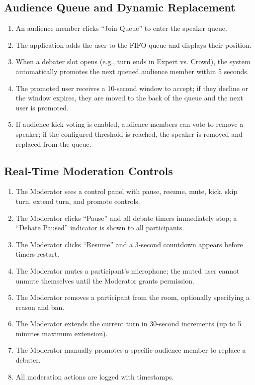 \documentclass[12pt]{article}
\begin{document}
\subsection{Audience Queue and Dynamic Replacement}

\begin{enumerate}
    \item An audience member clicks ``Join Queue'' to enter the speaker queue.
    \item The application adds the user to the FIFO queue and displays their position.
    \item When a debater slot opens (e.g., turn ends in Expert vs. Crowd), the system automatically promotes the next queued audience member within 5 seconds.
    \item The promoted user receives a 10-second window to accept; if they decline or the window expires, they are moved to the back of the queue and the next user is promoted.
    \item If audience kick voting is enabled, audience members can vote to remove a speaker; if the configured threshold is reached, the speaker is removed and replaced from the queue.
\end{enumerate}

\subsection{Real-Time Moderation Controls}

\begin{enumerate}
    \item The Moderator sees a control panel with pause, resume, mute, kick, skip turn, extend turn, and promote controls.
    \item The Moderator clicks ``Pause'' and all debate timers immediately stop; a ``Debate Paused'' indicator is shown to all participants.
    \item The Moderator clicks ``Resume'' and a 3-second countdown appears before timers restart.
    \item The Moderator mutes a participant's microphone; the muted user cannot unmute themselves until the Moderator grants permission.
    \item The Moderator removes a participant from the room, optionally specifying a reason and ban.
    \item The Moderator extends the current turn in 30-second increments (up to 5 minutes maximum extension).
    \item The Moderator manually promotes a specific audience member to replace a debater.
    \item All moderation actions are logged with timestamps.
\end{enumerate}
\end{document}
